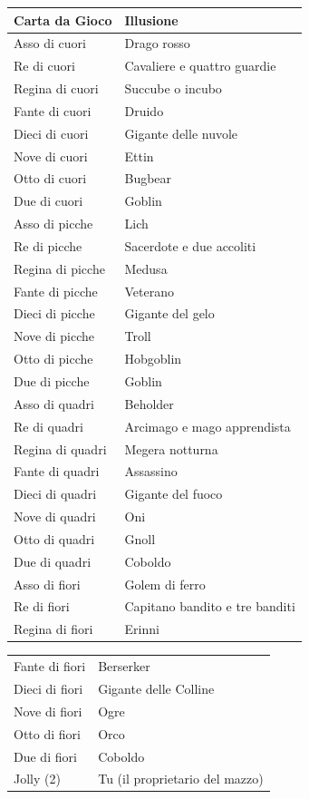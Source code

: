 \begin{multicols}{2}
\noindent\begin{tabularx}{0.48\textwidth}{ll}
\textbf{Carta da Gioco} & \textbf{Illusione} \\ \hline
Asso di cuori & Drago rosso \\
Re di cuori & Cavaliere e quattro guardie \\
Regina di cuori & Succube o incubo \\
Fante di cuori & Druido \\
Dieci di cuori & Gigante delle nuvole \\
Nove di cuori & Ettin \\
Otto di cuori & Bugbear \\
Due di cuori & Goblin \\
Asso di picche & Lich \\
Re di picche & Sacerdote e due accoliti \\
Regina di picche & Medusa \\
Fante di picche & Veterano \\
Dieci di picche & Gigante del gelo \\
Nove di picche & Troll \\
Otto di picche & Hobgoblin \\
Due di picche & Goblin \\
Asso di quadri & Beholder \\
Re di quadri & Arcimago e mago apprendista \\
Regina di quadri & Megera notturna \\
Fante di quadri & Assassino \\
Dieci di quadri & Gigante del fuoco \\
Nove di quadri & Oni \\
Otto di quadri & Gnoll \\
Due di quadri & Coboldo \\
Asso di fiori & Golem di ferro \\
Re di fiori & Capitano bandito e tre banditi \\
Regina di fiori & Erinni \\
\end{tabularx}
\noindent\begin{tabularx}{0.48\textwidth}{ll}
Fante di fiori & Berserker \\
Dieci di fiori & Gigante delle Colline \\
Nove di fiori & Ogre \\
Otto di fiori & Orco \\
Due di fiori & Coboldo \\
Jolly (2) & Tu (il proprietario del mazzo) \\
\end{tabularx}


\end{multicols}
